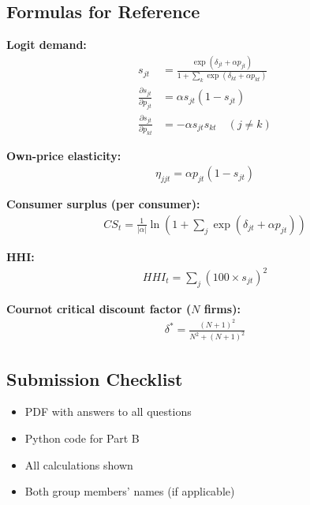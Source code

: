 \documentclass[11pt]{article}
\begin{document}
\newpage
\subsection*{Formulas for Reference}

\textbf{Logit demand:}
\begin{align*}
s_{jt} &= \frac{\exp(\delta_{jt} + \alpha p_{jt})}{1 + \sum_k \exp(\delta_{kt} + \alpha p_{kt})} \\
\frac{\partial s_{jt}}{\partial p_{jt}} &= \alpha s_{jt} (1 - s_{jt}) \\
\frac{\partial s_{jt}}{\partial p_{kt}} &= -\alpha s_{jt} s_{kt} \quad (j \neq k)
\end{align*}

\textbf{Own-price elasticity:}
\begin{align*}
\eta_{jjt} = \alpha p_{jt} (1 - s_{jt})
\end{align*}

\textbf{Consumer surplus (per consumer):}
\begin{align*}
CS_t = \frac{1}{|\alpha|} \ln\left(1 + \sum_j \exp(\delta_{jt} + \alpha p_{jt})\right)
\end{align*}

\textbf{HHI:}
\begin{align*}
HHI_t = \sum_j (100 \times s_{jt})^2
\end{align*}

\textbf{Cournot critical discount factor ($N$ firms):}
\begin{align*}
\delta^* = \frac{(N+1)^2}{N^2 + (N+1)^2}
\end{align*}

\subsection*{Submission Checklist}
\begin{itemize}
\item[$\square$] PDF with answers to all questions
\item[$\square$] Python code for Part B
\item[$\square$] All calculations shown
\item[$\square$] Both group members' names (if applicable)
\end{itemize}
\end{document}
